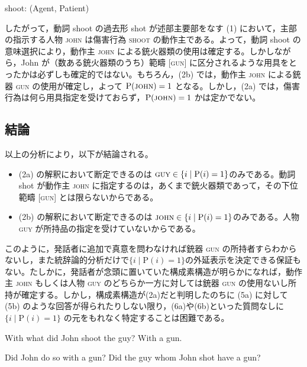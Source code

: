 \documentclass[oneside,dvipdfmx,tikz]{jsarticle}
\begin{document}
\begin{exe}
	\ex shoot: (Agent, Patient)
\end{exe}

\clearpage

したがって，動詞 shoot の過去形 shot が述部主要部をなす (1) において，主部の指示する人物 \textsc{john} は傷害\mbox{行為} \textsc{shoot} の動作主である。よって，動詞 shoot の意味選択により，動作主 \textsc{john} による銃火器類の使用は確定する。しかしながら，John が（数ある銃火器類のうち）範疇 \textsc{[gun]} に区分されるような用具をとったかは必ずしも確定的ではない。もちろん，(2b) では，動作主 \textsc{john} による銃器 \textsc{gun} の使用が確定し，よって \(\mathrm{P}(\text{\sc john})=1\) となる。しかし，(2a) では，傷害行為は何ら用具指定を受けておらず，\(\mathrm{P}(\text{\sc john})=1\) かは定かでない。

\subsection*{\rm\bf 結論}

以上の分析により，以下が結論される。
\begin{itemize}
\item (2a) の解釈において断定できるのは \(\text{\sc guy}\in\{ i \mid \mathrm{P}(i)=1\}\)のみである。動詞 shot が動作主 \textsc{john} に指定するのは，あくまで銃火器類であって，その下位範疇 \textsc{[gun]} とは限らないからである。
\item (2b) の解釈において断定できるのは \(\text{\sc john}\in\{ i \mid \mathrm{P}(i)=1\}\)のみである。人物 \textsc{guy} が所持品の指定を受けていないからである。
\end{itemize}

このように，発話者に追加で真意を問わなければ銃器 \textsc{gun} の所持者すらわからないし，また統辞論的分析\mbox{だけで}\(\{ i \mid \mathrm{P}(i)=1\}\)の外延表示を決定できる保証もない。たしかに，発話者が念頭に置いていた構成素構造が明らかになれば，動作主 \textsc{john} もしくは人物 \textsc{guy} のどちらか一方に対しては銃器 \textsc{gun} の使用ないし所持が確定する。しかし，構成素構造が(2a)だと判明したのちに (5a) に対して (5b) のような回答が得られたりしない限り，(6a)や(6b)といった質問なしに\(\{ i \mid \mathrm{P}(i)=1\}\) の元をもれなく特定することは困難である。

\begin{exe}
	\ex 
	\begin{xlist}
	\ex With what did John shoot the guy?
	\ex With a gun.
	\end{xlist}
	\ex 
	\begin{xlist}
	\ex Did John do so with a gun?
	\ex Did the guy whom John shot have a gun?
	\end{xlist}
\end{exe}
\end{document}
